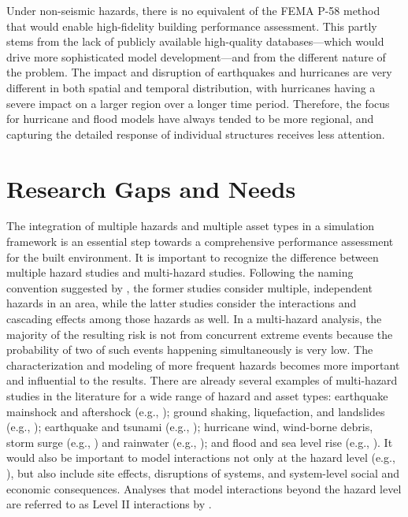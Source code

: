 Under non-seismic hazards, there is no equivalent of the FEMA P-58 method that would enable high-fidelity building performance assessment. This partly stems from the lack of publicly available high-quality databases---which would drive more sophisticated model development---and from the different nature of the problem. The impact and disruption of earthquakes and hurricanes are very different in both spatial and temporal distribution, with hurricanes having a severe impact on a larger region over a longer time period. Therefore, the focus for hurricane and flood models have always tended to be more regional, and capturing the detailed response of individual structures receives less attention. 

\section{Research Gaps and Needs}
\label{sec:perf_bldg_gaps}

The integration of multiple hazards and multiple asset types in a simulation framework is an essential step towards a comprehensive performance assessment for the built environment. It is important to recognize the difference between multiple hazard studies and multi-hazard studies. Following the naming convention suggested by \citet{bruneau2017state}, the former studies consider multiple, independent hazards in an area, while the latter studies consider the interactions and cascading effects among those hazards as well. In a multi-hazard analysis, the majority of the resulting risk is not from concurrent extreme events because the probability of two of such events happening simultaneously is very low. The characterization and modeling of more frequent hazards becomes more important and influential to the results. There are already several examples of multi-hazard studies in the literature for a wide range of hazard and asset types: earthquake mainshock and aftershock (e.g., \cite{nazari2015effect, zhang2013damage}); ground shaking, liquefaction, and landslides (e.g., \cite{elgamal2008three, kojima2014large}); earthquake and tsunami (e.g., \cite{akiyama2014reliability, carey2019multihazard}); hurricane wind, wind-borne debris, storm surge (e.g., \cite{lin2010windborne, park2014abv}) and rainwater (e.g., \cite{pita2012assessment}); and flood and sea level rise (e.g., \cite{hinkel2014coastal}). It would also be important to model interactions not only at the hazard level (e.g., \cite{gill2014reviewing}), but also include site effects, disruptions of systems, and system-level social and economic consequences. Analyses that model interactions beyond the hazard level are referred to as Level II interactions by \citet{zaghi2016establishing}.

